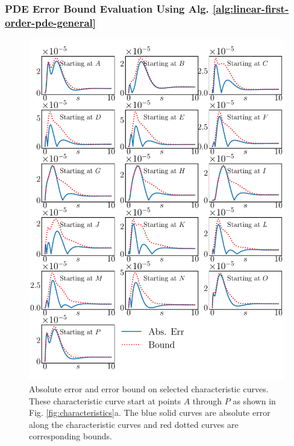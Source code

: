 \documentclass{uai2023}
\begin{document}
\subsubsection{PDE Error Bound Evaluation Using Alg. \ref{alg:linear-first-order-pde-general}}
    \begin{figure}[!ht]
        \centering
        \includegraphics[width=\linewidth]{assets/pde-error-bound.pdf}
        \caption{
            \small
            Absolute error and error bound on selected characteristic curves. 
            These characteristic curve start at points $A$ through $P$ as shown in Fig. \ref{fig:characteristics}a.
            The blue solid curves are absolute error along the characteristic curves and red dotted curves are corresponding bounds.
        }\label{fig:pde-error-bound}
    \end{figure}
\end{document}
